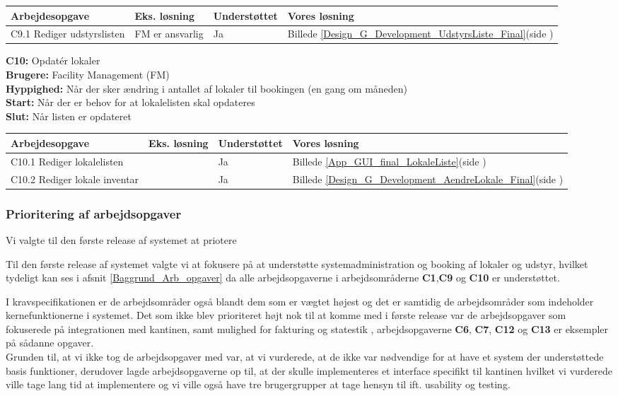 \begin{tabular}{ | p{7.5cm} | p{2.5cm} | p{2.2cm} | p{3.5cm} |}
\hline
\textbf{Arbejdesopgave} & \textbf{Eks. løsning} & \textbf{Understøttet}  & \textbf{Vores løsning}\\ 
\hline
C9.1 Rediger udstyrslisten & FM er ansvarlig & Ja & Billede \ref{Design_G_Development_UdstyrsListe_Final}(side \pageref{Design_G_Development_UdstyrsListe_Final}) \\ 
\hline
\end{tabular}

\textbf{C10:} Opdatér lokaler\\
\textbf{Brugere:} Facility Management (FM)\\
\textbf{Hyppighed:} Når der sker ændring i antallet af lokaler til bookingen (en gang om måneden)\\
\textbf{Start:} Når der er behov for at lokalelisten skal opdateres\\
\textbf{Slut:} Når listen er opdateret

\begin{tabular}{ | p{7.5cm} | p{2.5cm} | p{2.2cm} | p{3.2cm} |}
\hline
\textbf{Arbejdesopgave} & \textbf{Eks. løsning} & \textbf{Understøttet}  & \textbf{Vores løsning}\\ 
\hline
C10.1 Rediger lokalelisten & & Ja & Billede \ref{App_GUI_final_LokaleListe}(side \pageref{App_GUI_final_LokaleListe}) \\ 
\hline
C10.2 Rediger lokale inventar & & Ja & Billede \ref{Design_G_Development_AendreLokale_Final}(side \pageref{Design_G_Development_AendreLokale_Final}) \\ 
\hline
\end{tabular}

\subsubsection{Prioritering af arbejdsopgaver}
\label{Evaluation_workareas_priorities}
Vi valgte til den første release af systemet at priotere

Til den første release af systemet valgte vi at fokusere på at understøtte systemadministration og booking af lokaler og udstyr, hvilket tydeligt kan ses i afsnit \ref{Baggrund_Arb_opgaver} da alle arbejdsopgaverne i arbejdsområderne \textbf{C1},\textbf{C9} og \textbf{C10} er understøttet. 

I kravspecifikationen er de arbejdsområder også blandt dem som er vægtet højest og det er samtidig de arbejdsområder som indeholder kernefunktionerne i systemet. Det som ikke blev prioriteret højt nok til at komme med i første release var de arbejdsopgaver som fokuserede på integrationen med kantinen, samt mulighed for fakturing og statestik , arbejdsopgaverne \textbf{C6}, \textbf{C7}, \textbf{C12} og \textbf{C13} er eksempler på sådanne opgaver.
\\Grunden til, at vi ikke tog de arbejdsopgaver med var, at vi vurderede, at de ikke var nødvendige for at have et system der understøttede basis funktioner, derudover lagde arbejdsopgaverne op til, at der skulle implementeres et interface specifikt til kantinen hvilket vi vurderede ville tage lang tid at implementere og vi ville også have tre brugergrupper at tage hensyn til ift. usability og testing.


